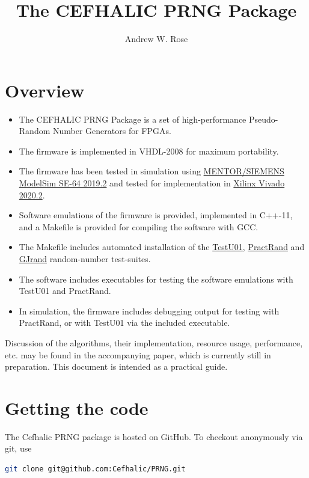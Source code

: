 \documentclass{article}
\title{The CEFHALIC PRNG Package}
\author{Andrew W. Rose}
\begin{document}
\maketitle

\section{Overview}

\begin{itemize}
\item The CEFHALIC PRNG Package is a set of high-performance Pseudo-Random Number Generators for FPGAs. 
\item The firmware is implemented in VHDL-2008 for maximum portability. 
\item The firmware has been tested in simulation using \href{https://eda.sw.siemens.com/en-US/ic/modelsim/}{MENTOR/SIEMENS ModelSim SE-64 2019.2} and tested for implementation in \href{https://www.xilinx.com/products/design-tools/vivado.html}{Xilinx Vivado 2020.2}.
\item Software emulations of the firmware is provided, implemented in C++-11, and a Makefile is provided for compiling the software with GCC.
\item The Makefile includes automated installation of the \href{http://simul.iro.umontreal.ca/testu01/tu01.html}{TestU01}, \href{http://pracrand.sourceforge.net/}{PractRand} and \href{http://gjrand.sourceforge.net/}{GJrand} random-number test-suites.
\item The software includes executables for testing the software emulations with TestU01 and PractRand.
\item In simulation, the firmware includes debugging output for testing with PractRand, or with TestU01 via the included executable.
\end{itemize}

Discussion of the algorithms, their implementation, resource usage, performance, etc. may be found in the accompanying paper, which is currently still in preparation. This document is intended as a practical guide.

\newpage

\section{Getting the code}

The Cefhalic PRNG package is hosted on GitHub. To checkout anonymously via git, use

\begin{minipage}{1.0\textwidth}
\centering
\begin{lstlisting}[language=bash , label=lst:GitClone]
git clone git@github.com:Cefhalic/PRNG.git
\end{lstlisting}
\end{minipage}
\end{document}
